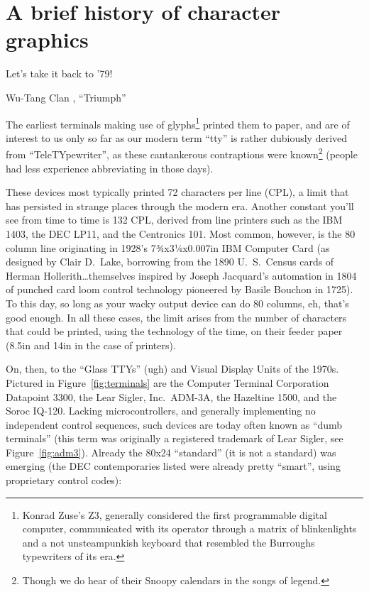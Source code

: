 \section{A brief history of character graphics}
\label{sec:terminals}
\epigraph{Let's take it back to '79!}{Wu-Tang Clan , ``Triumph''}
The earliest terminals making use of glyphs\footnote{Konrad Zuse's Z3, generally
 considered the first programmable digital computer, communicated with its
operator through a matrix of blinkenlights and a not unsteampunkish keyboard that resembled the
Burroughs typewriters of its era\cite{zuse}.} printed them to paper, and are of
interest to us only so far as our modern term ``tty'' is rather dubiously
derived from ``TeleTYpewriter'', as these cantankerous contraptions were
known\footnote{Though we do hear of their Snoopy calendars in the songs of
legend\cite{quiche}.} (people had less experience abbreviating in those days).

These devices most typically printed 72 characters per line (CPL), a limit that
has persisted in strange places\cite{pandoc} through the modern era. Another constant
you'll see from time to time is 132 CPL, derived from line printers such as the
IBM 1403, the DEC LP11, and the Centronics 101\cite{ibm1403}. Most common,
however, is the 80 column line originating in 1928's 7¾x3¼x0.007in IBM
Computer Card (as designed by Clair D.\ Lake, borrowing from the 1890 U.\ S.\
Census cards of Herman Hollerith\ldots themselves inspired by Joseph
Jacquard's automation in 1804 of punched card loom control technology pioneered
by Basile Bouchon in 1725\cite{cards}). To this day, so long as your wacky
output device can do 80 columns, eh, that's good enough. In all these cases,
the limit arises from the number of characters that could be printed, using the
technology of the time, on their feeder paper (8.5in and 14in in the case of
printers).

On, then, to the ``Glass TTYs'' (ugh) and Visual Display Units of the 1970s.
Pictured in Figure~\ref{fig:terminals} are the Computer Terminal Corporation
Datapoint 3300, the Lear Sigler, Inc.\ ADM-3A, the Hazeltine 1500, and the
Soroc IQ-120. Lacking microcontrollers, and generally implementing no
independent control sequences, such devices are today often known as ``dumb
terminals'' (this term was originally a registered trademark of Lear Sigler,
see Figure~\ref{fig:adm3}). Already the 80x24 ``standard'' (it is not a standard) was emerging
(the DEC contemporaries listed were already pretty ``smart'', using proprietary
control codes):

